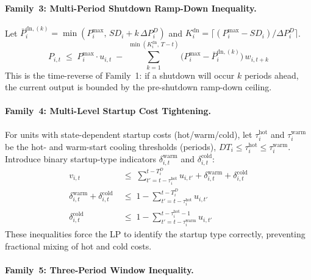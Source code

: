 \paragraph{Family~3: Multi-Period Shutdown Ramp-Down Inequality.}

Let $\bar{P}_i^{\mathrm{dn},(k)} = \min(P^{\max}_i,\, SD_i + k\,\Delta P^D_i)$ and
$K_i^{\mathrm{dn}} = \lceil(P^{\max}_i - SD_i)/\Delta P^D_i\rceil$.
\begin{equation}\label{eq:cut-ramp-down}
  \boxed{
    P_{i,t}
    \;\leq\;
    P^{\max}_i \cdot u_{i,t}
    \;-\;
    \sum_{k=1}^{\min(K_i^{\mathrm{dn}},\, T-t)} \bigl(P^{\max}_i - \bar{P}_i^{\mathrm{dn},(k)}\bigr)\,w_{i,t+k}
  }
\end{equation}
This is the time-reverse of Family~1: if a shutdown will occur $k$ periods
ahead, the current output is bounded by the pre-shutdown ramp-down ceiling.

\paragraph{Family~4: Multi-Level Startup Cost Tightening.}

For units with state-dependent startup costs (hot/warm/cold), let
$\tau_i^{\mathrm{hot}}$ and $\tau_i^{\mathrm{warm}}$ be the hot- and warm-start
cooling thresholds (periods), $DT_i \leq \tau_i^{\mathrm{hot}} \leq \tau_i^{\mathrm{warm}}$.
Introduce binary startup-type indicators $\delta_{i,t}^{\mathrm{warm}}$ and
$\delta_{i,t}^{\mathrm{cold}}$:
\begin{align}
  v_{i,t} &\;\leq\; \sum_{t'=t-\tau_i^{\mathrm{hot}}}^{t-T^D_i} u_{i,t'}
                   + \delta_{i,t}^{\mathrm{warm}} + \delta_{i,t}^{\mathrm{cold}}
  \label{eq:cut-sutype-a}\\
  \delta_{i,t}^{\mathrm{warm}} + \delta_{i,t}^{\mathrm{cold}}
  &\;\leq\; 1 - \sum_{t'=t-\tau_i^{\mathrm{hot}}}^{t-T^D_i} u_{i,t'}
  \label{eq:cut-sutype-b}\\
  \delta_{i,t}^{\mathrm{cold}}
  &\;\leq\; 1 - \sum_{t'=t-\tau_i^{\mathrm{warm}}}^{t-\tau_i^{\mathrm{hot}}-1} u_{i,t'}
  \label{eq:cut-sutype-c}
\end{align}
These inequalities force the LP to identify the startup type correctly,
preventing fractional mixing of hot and cold costs.

\paragraph{Family~5: Three-Period Window Inequality.}

